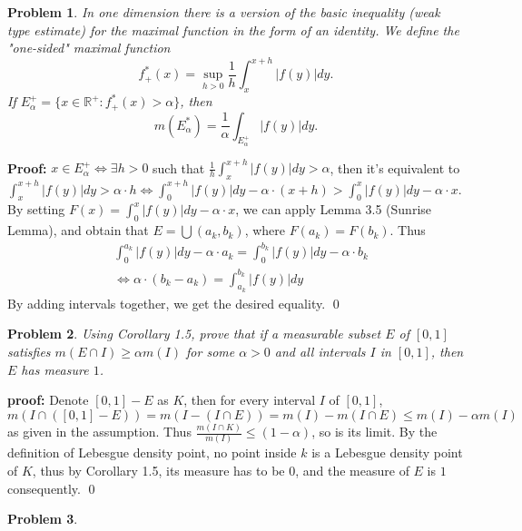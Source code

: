\documentclass[12pt]{article}
\newtheorem{problem}{Problem}
\begin{document}
\begin{problem}
In one dimension there is a version of the basic inequality (weak type estimate) for the maximal function in the form of an identity. We define the "one-sided" maximal function 
$$
f^{*}_{+}(x) = \sup_{h > 0} \frac{1}{h}\int_{x}^{x+h}|f(y)|dy. 
$$ If $E_{\alpha}^{+}=\{x\in\mathbb{R}^{+}: f^{*}_{+}(x) >\alpha\}$, then 
$$
m(E_{\alpha}^{*}) = \frac{1}{\alpha}\int_{E_{\alpha}^{+}}|f(y)|dy.
$$
\end{problem} 

\textbf{Proof:} $x\in E_{\alpha}^{+} \iff \exists h >0$ such that $\frac{1}{h}\int_{x}^{x+h}|f(y)|dy >\alpha$, then it's equivalent to $\int_{x}^{x+h}|f(y)|dy>\alpha\cdot h\iff \int_{0}^{x+h}|f(y)|dy-\alpha\cdot (x+h) > \int_{0}^{x}|f(y)|dy - \alpha\cdot x$. By setting $F(x) = \int_{0}^{x}|f(y)|dy - \alpha\cdot x$, we can apply Lemma 3.5 (Sunrise Lemma), and obtain that $E=\bigcup (a_{k}, b_{k})$, where $F(a_{k}) = F(b_{k})$. Thus 
\begin{eqnarray*}
&\int_{0}^{a_{k}}|f(y)|dy - \alpha\cdot a_{k} = \int_{0}^{b_{k}}|f(y)|dy - \alpha\cdot b_{k} \\
&\iff \alpha\cdot (b_{k}-a_{k}) = \int_{a_{k}}^{b_{k}}|f(y)|dy
\end{eqnarray*} By adding intervals together, we get the desired equality. \qed

\begin{problem}
Using Corollary 1.5, prove that if a measurable subset $E$ of $[0,1]$ satisfies $m(E\cap I)\geq \alpha m(I)$ for some $\alpha > 0$ and all intervals $I$ in $[0, 1]$, then $E$ has measure $1$. 
\end{problem}

\textbf{proof:} Denote $[0, 1] - E$ as $K$, then for every interval $I$ of $[0,1]$, $m(I\cap ([0,1] - E)) = m(I - (I\cap E)) = m(I) - m(I\cap E) \leq m(I) - \alpha m(I)$ as given in the assumption. Thus $\frac{m(I\cap K)}{m(I)}\leq (1-\alpha)$, so is its limit. By the definition of Lebesgue density point, no point inside $k$ is a Lebesgue density point of $K$, thus by Corollary 1.5, its measure has to be $0$, and the measure of $E$ is $1$ consequently. \qed

\begin{problem}

\end{problem}
\end{document}
